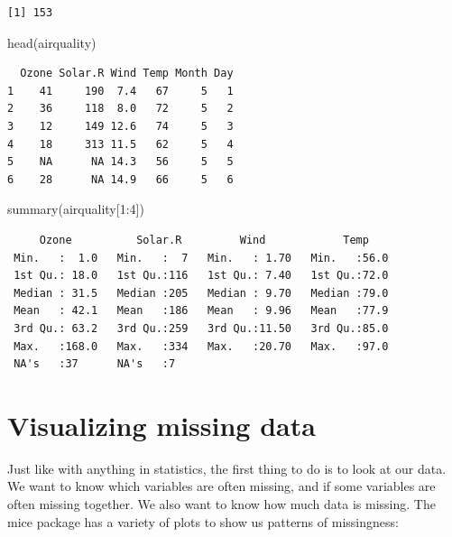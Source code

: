 \documentclass[
  letterpaper,
  DIV=11,
  numbers=noendperiod]{scrreprt}
\newenvironment{Shaded}{\begin{snugshade}}{\end{snugshade}}
\newcommand{\DecValTok}[1]{\textcolor[rgb]{0.25,0.63,0.44}{#1}}
\newcommand{\FunctionTok}[1]{\textcolor[rgb]{0.02,0.16,0.49}{#1}}
\newcommand{\NormalTok}[1]{\textcolor[rgb]{0.00,0.44,0.13}{#1}}
\newcommand{\SpecialCharTok}[1]{\textcolor[rgb]{0.25,0.44,0.63}{#1}}
\begin{document}
\begin{verbatim}
[1] 153
\end{verbatim}

\begin{Shaded}
\begin{Highlighting}[]
  \FunctionTok{head}\NormalTok{(airquality)}
\end{Highlighting}
\end{Shaded}

\begin{verbatim}
  Ozone Solar.R Wind Temp Month Day
1    41     190  7.4   67     5   1
2    36     118  8.0   72     5   2
3    12     149 12.6   74     5   3
4    18     313 11.5   62     5   4
5    NA      NA 14.3   56     5   5
6    28      NA 14.9   66     5   6
\end{verbatim}

\begin{Shaded}
\begin{Highlighting}[]
  \FunctionTok{summary}\NormalTok{(airquality[}\DecValTok{1}\SpecialCharTok{:}\DecValTok{4}\NormalTok{])}
\end{Highlighting}
\end{Shaded}

\begin{verbatim}
     Ozone          Solar.R         Wind            Temp     
 Min.   :  1.0   Min.   :  7   Min.   : 1.70   Min.   :56.0  
 1st Qu.: 18.0   1st Qu.:116   1st Qu.: 7.40   1st Qu.:72.0  
 Median : 31.5   Median :205   Median : 9.70   Median :79.0  
 Mean   : 42.1   Mean   :186   Mean   : 9.96   Mean   :77.9  
 3rd Qu.: 63.2   3rd Qu.:259   3rd Qu.:11.50   3rd Qu.:85.0  
 Max.   :168.0   Max.   :334   Max.   :20.70   Max.   :97.0  
 NA's   :37      NA's   :7                                   
\end{verbatim}

\newpage

\hypertarget{visualizing-missing-data}{%
\section{Visualizing missing data}\label{visualizing-missing-data}}

Just like with anything in statistics, the first thing to do is to look
at our data. We want to know which variables are often missing, and if
some variables are often missing together. We also want to know how much
data is missing. The mice package has a variety of plots to show us
patterns of missingness:
\end{document}
